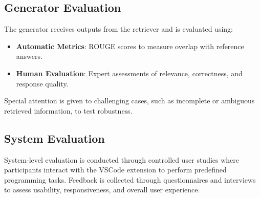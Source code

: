\subsection{Generator Evaluation}

The generator receives outputs from the retriever and is evaluated using:
\begin{itemize}
    \item \textbf{Automatic Metrics}: ROUGE scores to measure overlap with reference answers.
    \item \textbf{Human Evaluation}: Expert assessments of relevance, correctness, and response quality.
\end{itemize}
Special attention is given to challenging cases, such as incomplete or ambiguous retrieved information, to test robustness.

\subsection{System Evaluation}

System-level evaluation is conducted through controlled user studies where participants interact with the VSCode extension to perform predefined programming tasks. Feedback is collected through questionnaires and interviews to assess usability, responsiveness, and overall user experience.

\newpage